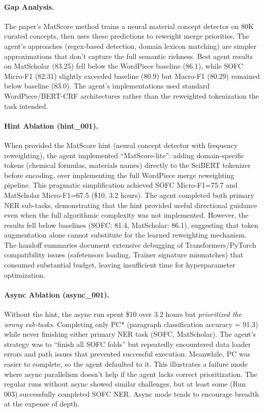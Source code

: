 \documentclass[11pt]{article}
\theoremstyle{plain}
\theoremstyle{definition}
\theoremstyle{remark}
\begin{document}
\paragraph{Gap Analysis.} The paper's MatScore method trains a neural material concept detector on 80K curated concepts, then uses these predictions to reweight merge priorities. The agent's approaches (regex-based detection, domain lexicon matching) are simpler approximations that don't capture the full semantic richness. Best agent results on MatScholar (83.25) fell below the WordPiece baseline (86.1), while SOFC Micro-F1 (82.31) slightly exceeded baseline (80.9) but Macro-F1 (80.29) remained below baseline (83.0). The agent's implementations used standard WordPiece/BERT-CRF architectures rather than the reweighted tokenization the task intended.

\paragraph{Hint Ablation (hint\_001).} When provided the MatScore hint (neural concept detector with frequency reweighting), the agent implemented ``MatScore-lite'': adding domain-specific tokens (chemical formulas, materials names) directly to the SciBERT tokenizer before encoding, over implementing the full WordPiece merge reweighting pipeline. This pragmatic simplification achieved SOFC Micro-F1=75.7 and MatScholar Micro-F1=67.5 (\$10, 3.2 hours). The agent completed both primary NER sub-tasks, demonstrating that the hint provided useful directional guidance even when the full algorithmic complexity was not implemented. However, the results fell below baselines (SOFC: 81.4, MatScholar: 86.1), suggesting that token augmentation alone cannot substitute for the learned reweighting mechanism. The handoff summaries document extensive debugging of Transformers/PyTorch compatibility issues (safetensors loading, Trainer signature mismatches) that consumed substantial budget, leaving insufficient time for hyperparameter optimization.

\paragraph{Async Ablation (async\_001).} Without the hint, the async run spent \$10 over 3.2 hours but \textit{prioritized the wrong sub-tasks}. Completing only PC* (paragraph classification accuracy = 91.3) while never finishing either primary NER task (SOFC, MatScholar). The agent's strategy was to ``finish all SOFC folds'' but repeatedly encountered data loader errors and path issues that prevented successful execution. Meanwhile, PC was easier to complete, so the agent defaulted to it. This illustrates a failure mode where async parallelism doesn't help if the agent lacks correct prioritization. The regular runs without async showed similar challenges, but at least some (Run 003) successfully completed SOFC NER. Async mode tends to encourage breadth at the expense of depth.
\end{document}
